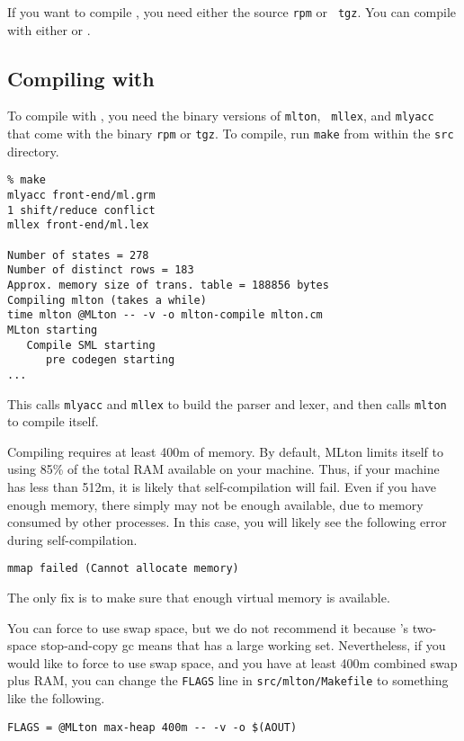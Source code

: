 
If you want to compile {\mlton}, you need either the source {\tt rpm} or {\tt
tgz}.  You can compile with either {\mlton} or {\smlnj}.

\subsection{Compiling with {\mlton}}

To compile with {\mlton}, you need the binary versions of {\tt mlton}, {\tt
mllex}, and {\tt mlyacc} that come with the binary {\tt rpm} or {\tt tgz}.  To
compile, run {\tt make} from within the {\tt src} directory.
\begin{verbatim}
% make
mlyacc front-end/ml.grm
1 shift/reduce conflict
mllex front-end/ml.lex

Number of states = 278
Number of distinct rows = 183
Approx. memory size of trans. table = 188856 bytes
Compiling mlton (takes a while)
time mlton @MLton -- -v -o mlton-compile mlton.cm
MLton starting
   Compile SML starting
      pre codegen starting
...
\end{verbatim}
This calls {\tt mlyacc} and {\tt mllex} to build the parser and lexer, and then
calls {\tt mlton} to compile itself.

Compiling {\mlton} requires at least 400m of memory.  By default, MLton limits
itself to using 85\% of the total RAM available on your machine.  Thus, if your
machine has less than 512m, it is likely that self-compilation will fail.  Even
if you have enough memory, there simply may not be enough available, due to
memory consumed by other processes.  In this case, you will likely see the
following error during self-compilation.
\begin{verbatim}
mmap failed (Cannot allocate memory)
\end{verbatim}
The only fix is to make sure that enough virtual memory is available.

You can force {\mlton} to use swap space, but we do not recommend it because
{\mlton}'s two-space stop-and-copy gc means that {\mlton} has a large working
set.  Nevertheless, if you would like to force {\mlton} to use swap space, and
you have at least 400m combined swap plus RAM, you can change the {\tt FLAGS}
line in {\tt src/mlton/Makefile} to something like the following.
\begin{verbatim}
FLAGS = @MLton max-heap 400m -- -v -o $(AOUT)
\end{verbatim}

